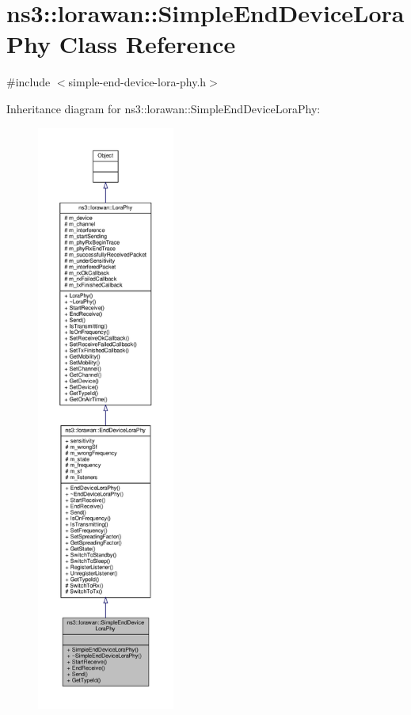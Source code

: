 \hypertarget{classns3_1_1lorawan_1_1SimpleEndDeviceLoraPhy}{}\section{ns3\+:\+:lorawan\+:\+:Simple\+End\+Device\+Lora\+Phy Class Reference}
\label{classns3_1_1lorawan_1_1SimpleEndDeviceLoraPhy}


{\ttfamily \#include $<$simple-\/end-\/device-\/lora-\/phy.\+h$>$}



Inheritance diagram for ns3\+:\+:lorawan\+:\+:Simple\+End\+Device\+Lora\+Phy\+:
\nopagebreak
\begin{figure}[H]
\begin{center}
\leavevmode
\includegraphics[height=550pt]{classns3_1_1lorawan_1_1SimpleEndDeviceLoraPhy__inherit__graph}
\end{center}
\end{figure}


